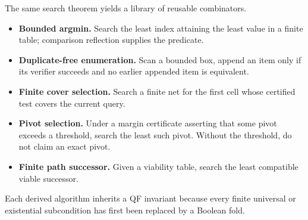 The same search theorem yields a library of reusable combinators.
\begin{itemize}
  \item \textbf{Bounded argmin.}  Search the least index attaining the least value in a finite table; comparison reflection supplies the predicate.
  \item \textbf{Duplicate-free enumeration.}  Scan a bounded box, append an item only if its verifier succeeds and no earlier appended item is equivalent.
  \item \textbf{Finite cover selection.}  Search a finite net for the first cell whose certified test covers the current query.
  \item \textbf{Pivot selection.}  Under a margin certificate asserting that some pivot exceeds a threshold, search the least such pivot.  Without the threshold, do not claim an exact pivot.
  \item \textbf{Finite path successor.}  Given a viability table, search the least compatible viable successor.
\end{itemize}
Each derived algorithm inherits a QF invariant because every finite universal or existential subcondition has first been replaced by a Boolean fold.
